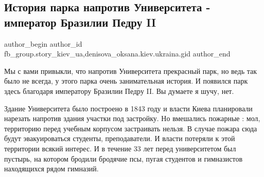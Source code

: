  
 
 
 
 
 
\subsection{История парка напротив Университета - император Бразилии Педру II}
\label{sec:08_12_2021.fb.fb_group.story_kiev_ua.1.park_univer_brazilia}
 
\ifcmt
 author_begin
   author_id fb_group.story_kiev_ua,denisova_oksana.kiev.ukraina.gid
 author_end
\fi

\begin{multicols}{2} %

Мы с вами привыкли, что напротив Университета прекрасный парк, но ведь так было
не всегда, у этого парка очень занимательная история. И появился парк здесь
благодаря императору Бразилии  Педру II. Вы думаете я шучу, нет. 

\setlength{\parindent}{0pt}


\end{multicols} %

Здание Университета было построено в 1843 году и власти Киева планировали
нарезать напротив здания участки под застройку. Но вмешались пожарные : мол,
территорию перед учебным корпусом застраивать нельзя. В случае пожара сюда
будут эвакуироваться студенты, преподаватели. И власти потеряли к этой
территории всякий интерес. И в течение 33 лет перед университетом был пустырь,
на  котором бродили бродячие псы, пугая студентов и гимназистов находящихся
рядом гимназий. 

